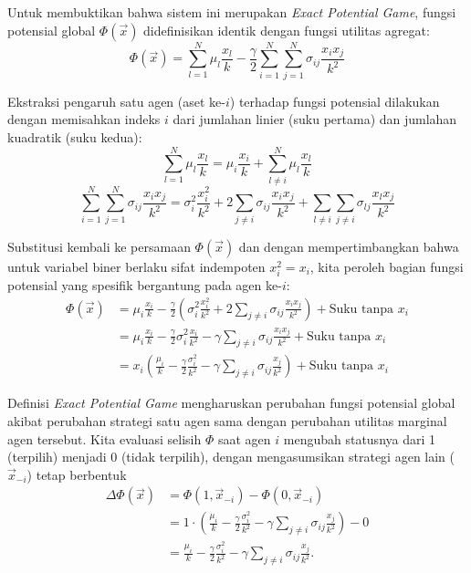 Untuk membuktikan bahwa sistem ini merupakan \textit{Exact Potential Game}, fungsi potensial global $\Phi(\vec{x})$ didefinisikan identik dengan fungsi utilitas agregat:
\begin{equation}
    \Phi(\vec{x}) = \sum_{l=1}^N \mu_l \frac{x_l}{k} - \frac{\gamma}{2}\sum_{i=1}^N\sum_{j=1}^N \sigma_{ij} \frac{x_i x_j}{k^2}
\end{equation}

Ekstraksi pengaruh satu agen (aset ke-$i$) terhadap fungsi potensial dilakukan dengan memisahkan indeks $i$ dari jumlahan linier (suku pertama) dan jumlahan kuadratik (suku kedua):
\begin{equation}
    \sum_{l=1}^N \mu_l \frac{x_l}{k} = \mu_i \frac{x_i}{k} + \sum_{l \neq i}^N \mu_l \frac{x_l}{k}
\end{equation}
\begin{equation}
    \sum_{i=1}^N\sum_{j=1}^N \sigma_{ij} \frac{x_i x_j}{k^2} = \sigma_i^2 \frac{x_i^2}{k^2} + 2\sum_{j \neq i}\sigma_{ij} \frac{x_ix_j}{k^2} + \sum_{l \neq i}\sum_{j \neq i} \sigma_{lj}\frac{x_l x_j}{k^2}
\end{equation}

Substitusi kembali ke persamaan $\Phi(\vec{x})$ dan dengan mempertimbangkan bahwa untuk variabel biner berlaku sifat indempoten $x_i^2 = x_i$, kita peroleh bagian fungsi potensial yang spesifik bergantung pada agen ke-$i$:
\begin{equation}
\begin{split}
    \Phi(\vec{x}) &= \mu_i \frac{x_i}{k} - \frac{\gamma}{2}\left(\sigma_i^2 \frac{x_i^2}{k^2} + 2\sum_{j \neq i}\sigma_{ij} \frac{x_ix_j}{k^2} \right) + \text{Suku tanpa } x_i \\
    &= \mu_i \frac{x_i}{k} - \frac{\gamma}{2}\sigma_i^2 \frac{x_i}{k^2} - \gamma \sum_{j \neq i}\sigma_{ij}\frac{x_i x_j}{k^2} + \text{Suku tanpa } x_i \\
    &= x_i \left( \frac{\mu_i}{k} - \frac{\gamma}{2}\frac{\sigma_i^2}{k^2} - \gamma \sum_{j \neq i}\sigma_{ij}\frac{x_j}{k^2} \right) + \text{Suku tanpa } x_i
\end{split}
\end{equation}

Definisi \textit{Exact Potential Game} mengharuskan perubahan fungsi potensial global akibat perubahan strategi satu agen sama dengan perubahan utilitas marginal agen tersebut. Kita evaluasi selisih $\Phi$ saat agen $i$ mengubah statusnya dari 1 (terpilih) menjadi 0 (tidak terpilih), dengan mengasumsikan strategi agen lain ($\vec{x}_{-i}$) tetap berbentuk
\begin{equation}
\begin{split}
    \Delta \Phi(\vec{x}) &= \Phi(1, \vec{x}_{-i}) - \Phi(0, \vec{x}_{-i}) \\
    &= 1 \cdot \left( \frac{\mu_i}{k} - \frac{\gamma}{2}\frac{\sigma_i^2}{k^2} - \gamma \sum_{j \neq i}\sigma_{ij}\frac{x_j}{k^2} \right) - 0 \\
    &= \frac{\mu_i}{k} - \frac{\gamma}{2}\frac{\sigma_i^2}{k^2} - \gamma \sum_{j \neq i}\sigma_{ij}\frac{x_j}{k^2}.
\end{split}
\end{equation}
